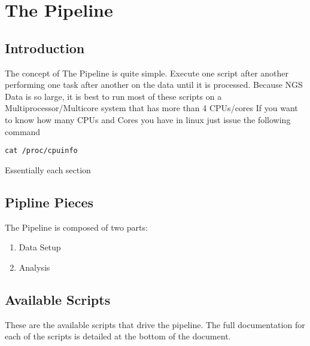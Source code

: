 \documentclass{article}
\begin{document}
\section{The Pipeline}

\subsection{Introduction}
The concept of The Pipeline is quite simple. Execute one script after another performing one task after another on the data until it is processed. Because NGS Data is so large, it is best to run most of these scripts on a Multiprocessor/Multicore system that has more than 4 CPUs/cores
If you want to know how many CPUs and Cores you have in linux just issue the following command
\begin{lstlisting}
cat /proc/cpuinfo
\end{lstlisting}
Essentially each section

\subsection{Pipline Pieces}
The Pipeline is composed of two parts:
\begin{enumerate}
\item Data Setup
\item Analysis
\end{enumerate}

\subsection{Available Scripts}
These are the available scripts that drive the pipeline.
The full documentation for each of the scripts is detailed at the bottom of the document.
\end{document}
